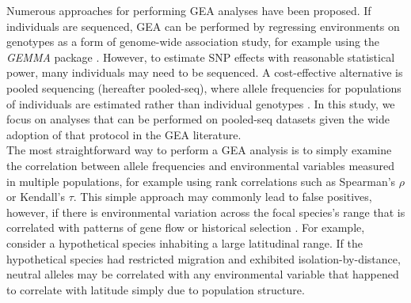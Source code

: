 \documentclass[10pt,twoside,lineno]{GSA_format}
\begin{document}
Numerous approaches for performing GEA analyses have been proposed. If individuals are sequenced, GEA can be performed by regressing environments on genotypes as a form of genome-wide association study, for example using the \textit{GEMMA} package \citep{Zhou2013}. However, to estimate SNP effects with reasonable statistical power, many individuals may need to be sequenced. A cost-effective alternative is pooled sequencing (hereafter pooled-seq), where allele frequencies for populations of individuals are estimated rather than individual genotypes \citep{Schlotterer2014}. In this study, we focus on analyses that can be performed on pooled-seq datasets given the wide adoption of that protocol in the GEA literature.\\

The most straightforward way to perform a GEA analysis is to simply examine the correlation between allele frequencies and environmental variables measured in multiple populations, for example using rank correlations such as Spearman's $\rho$ or Kendall's $\tau$. This simple approach may commonly lead to false positives, however, if there is environmental variation across the focal species's range that is correlated with patterns of gene flow or historical selection \citep{Meirmans2012,Novembre2009}. For example, consider a hypothetical species inhabiting a large latitudinal range. If the hypothetical species had restricted migration and exhibited isolation-by-distance, neutral alleles may be correlated with any environmental variable that happened to correlate with latitude simply due to population structure.  \\

\end{document}

